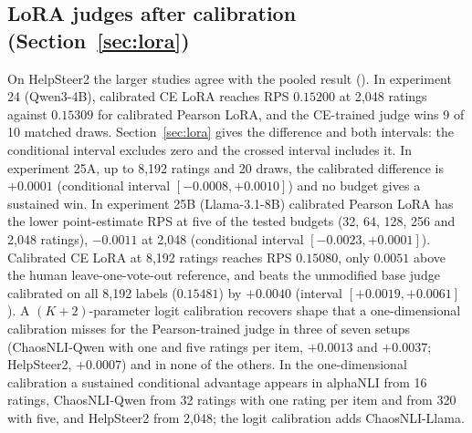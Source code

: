 \begin{table}[h]
\caption{\textbf{The cross-entropy (CE) fit is ahead of the Pearson fit for every judge, and clears the formal test for two.}
Five frontier judges on 160 homework answers at 256 training ratings (two per answer), experiment 26.
Held-out test ranked probability score (RPS), 0--1, lower is better; Uncal.: raw judge; Train hist.: smoothed training grade histogram; Diff.: test RPS of the Pearson-fit judge minus test RPS of the CE-fit judge (positive favors CE-fit).
Test unit: ten held-out homework assignments (16 answers each), 200 training draws per assignment; the last row is the six-grade uniform forecast.
The last column is the smallest budget down to which the one-sided level-0.01 descending test passes from 256.
Both fits search the same 27 calibration settings exhaustively on the training ratings.}
\label{tab:exp26}
\centering\scriptsize
\setlength{\tabcolsep}{3pt}

\end{table}

\subsection{LoRA judges after calibration (Section~\ref{sec:lora})}
\label{app:extra-lora}

On HelpSteer2 the larger studies agree with the pooled result ().
In experiment 24 (Qwen3-4B), calibrated CE LoRA reaches RPS $0.15200$ at 2{,}048 ratings against $0.15309$ for calibrated Pearson LoRA, and the CE-trained judge wins 9 of 10 matched draws.
Section~\ref{sec:lora} gives the difference and both intervals: the conditional interval excludes zero and the crossed interval includes it.
In experiment 25A, up to 8{,}192 ratings and 20 draws, the calibrated difference is $+0.0001$ (conditional interval $[-0.0008,+0.0010]$) and no budget gives a sustained win.
In experiment 25B (Llama-3.1-8B) calibrated Pearson LoRA has the lower point-estimate RPS at five of the tested budgets (32, 64, 128, 256 and 2{,}048 ratings), $-0.0011$ at 2{,}048 (conditional interval $[-0.0023,+0.0001]$).
Calibrated CE LoRA at 8{,}192 ratings reaches RPS $0.15080$, only $0.0051$ above the human leave-one-vote-out reference, and beats the unmodified base judge calibrated on all 8{,}192 labels ($0.15481$) by $+0.0040$ (interval $[+0.0019,+0.0061]$).
A $(K+2)$-parameter logit calibration recovers shape that a one-dimensional calibration misses for the Pearson-trained judge in three of seven setups (ChaosNLI-Qwen with one and five ratings per item, $+0.0013$ and $+0.0037$; HelpSteer2, $+0.0007$) and in none of the others.
In the one-dimensional calibration a sustained conditional advantage appears in alphaNLI from 16 ratings, ChaosNLI-Qwen from 32 ratings with one rating per item and from 320 with five, and HelpSteer2 from 2{,}048; the logit calibration adds ChaosNLI-Llama.

